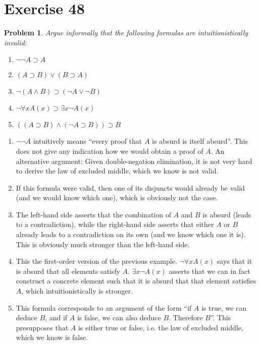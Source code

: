 \documentclass[a4paper,10pt]{article}
\newcommand{\imp}{\supset}
\newtheorem*{problem*}{Problem}
\theoremstyle{definition}
\begin{document}
 \section*{Exercise 48}
 \begin{problem*}
  Argue informally that the following formulas are intuitionistically invalid:
  \begin{enumerate}
  \item $¬¬A \imp A$
  \item $(A \imp B)  ∨ (B \imp A)$
  \item $¬(A∧B) \imp (¬A ∨ ¬B)$
   \item $¬\forall x A(x) \imp \exists x ¬A(x)$
   \item $((A \imp B) ∧ (¬A \imp B)) \imp B$
  \end{enumerate}
 \end{problem*}
\begin{enumerate}
\item $¬¬A$ intuitively means ``every proof that $A$ is absurd is itself absurd''. This does not give any indication how we would obtain a proof of $A$. An alternative argument: Given double-negation elimination, it is not very hard to derive the law of excluded middle, which we know is not valid.
\item If this formula were valid, then one of its disjuncts would already be valid (and we would know which one), which is obviously not the case.
\item The left-hand side asserts that the combination of $A$ and $B$ is absurd (leads to a contradiction), while the right-hand side asserts that either $A$ or $B$ already leads to a contradiction on its own (and we know which one it is). This is obviously much stronger than the left-hand side.
 \item This the first-order version of the previous example. $¬\forall x A(x)$ says that it is absurd that all elements satisfy $A$. $\exists x ¬A(x)$ asserts that we can in fact construct a concrete element such that it is absurd that that element satisfies $A$, which intuitionistically is stronger.
 \item This formula corresponds to an argument of the form ``if $A$ is true, we can deduce $B$, and if $A$ is false, we can also deduce $B$. Therefore $B$''. This presupposes that $A$ is either true or false, i.e. the law of excluded middle, which we know is false.
\end{enumerate}
\end{document}
